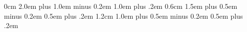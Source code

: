\newenvironment{ppteadmise}{\begin{framed}\begin{fppteadmise}}{\end{fppteadmise}\end{framed}}
\newenvironment{pptes}{\begin{framed}\begin{fpptes}}{\end{fpptes}\end{framed}}
\newenvironment{lem}{\begin{framed}\begin{flem}}{\end{flem}\end{framed}}
\newenvironment{meth}{\begin{framed}\begin{fmeth}}{\end{fmeth}\end{framed}}
\newenvironment{boa}{\begin{framed}\begin{fboa}}{\end{fboa}\end{framed}}

\usepackage[english,french]{babel}
\DecimalMathComma
{}

\usepackage{titlesec}
\renewcommand{\thesection}{\Roman{section}.}
\renewcommand{\thesubsection}{\arabic{subsection}.}
\renewcommand{\thesubsubsection}{\alph{subsubsection}.}
\titlespacing*{\section}		{0cm}	{2.0em plus 1.0em minus 0.2em}	{1.0em plus .2em}
\titlespacing*{\subsection}		{0.6cm}	{1.5em plus 0.5em minus 0.2em}	{0.5em plus .2em}
\titlespacing*{\subsubsection}	{1.2cm}	{1.0em plus 0.5em minus 0.2em}	{0.5em plus .2em}


